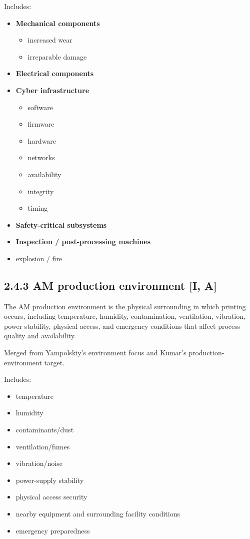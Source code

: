 \documentclass[10pt,a4paper,oneside]{report}
\begin{document}
Includes:

\begin{itemize}
\item \textbf{Mechanical components}
\begin{itemize}
\item increased wear
\item irreparable damage
\end{itemize}
\item \textbf{Electrical components}
\item \textbf{Cyber infrastructure}
\begin{itemize}
\item software
\item firmware
\item hardware
\item networks
\item availability
\item integrity
\item timing
\end{itemize}
\item \textbf{Safety-critical subsystems}
\item \textbf{Inspection / post-processing machines}
\item explosion / fire
\end{itemize}


\subsection{2.4.3 AM production environment [I, A]}


The AM production environment is the physical surrounding in which printing occurs, including temperature, humidity, contamination, ventilation, vibration, power stability, physical access, and emergency conditions that affect process quality and availability.

Merged from Yampolskiy's environment focus and Kumar's production-environment target.

Includes:

\begin{itemize}
\item temperature
\item humidity
\item contaminants/dust
\item ventilation/fumes
\item vibration/noise
\item power-supply stability
\item physical access security
\item nearby equipment and surrounding facility conditions
\item emergency preparedness
\end{itemize}
\end{document}

